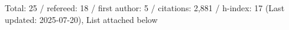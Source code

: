 Total: 25 / refereed: 18 / first author: 5 / citations: 2,881 / h-index: 17 (Last updated: 2025-07-20), List attached below